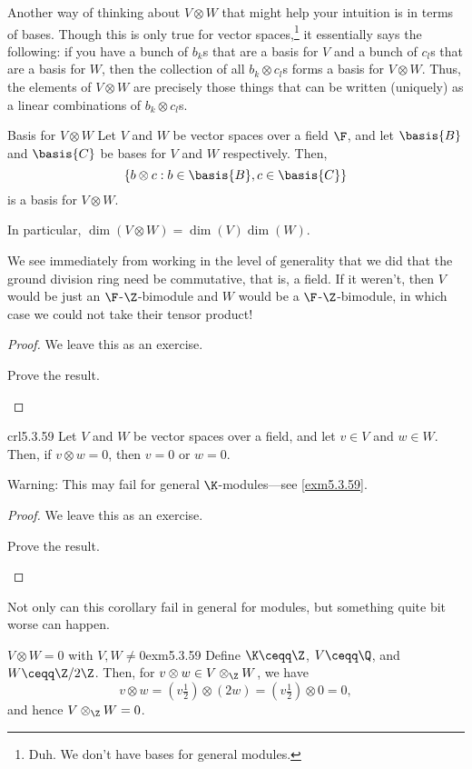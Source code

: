 Another way of thinking about $V\otimes W$ that might help your intuition is in terms of bases.  Though this is only true for vector spaces,\footnote{Duh.  We don't have bases for general modules.} it essentially says the following:  if you have a bunch of $b_k$s that are a basis for $V$ and a bunch of $c_l$s that are a basis for $W$, then the collection of all $b_k\otimes c_l$s forms a basis for $V\otimes W$.  Thus, the elements of $V\otimes W$ are precisely those things that can be written (uniquely) as a linear combinations of $b_k\otimes c_l$s.
\begin{prp}{Basis for $V\otimes W$}{}
	Let $V$ and $W$ be vector spaces over a field $\F$, and let $\basis{B}$ and $\basis{C}$ be bases for $V$ and $W$ respectively.  Then,
	\begin{equation}
	\left\{ b\otimes c:b\in \basis{B},c\in \basis{C}\right\}
	\end{equation}
	is a basis for $V\otimes W$.
	\begin{rmk}
		In particular, $\dim (V\otimes W)=\dim (V)\dim (W)$.
	\end{rmk}
	\begin{rmk}
		We see immediately from working in the level of generality that we did that the ground division ring need be commutative, that is, a field.  If it weren't, then $V$ would be just an $\F$-$\Z$-bimodule and $W$ would be a $\F$-$\Z$-bimodule, in which case we could not take their tensor product!
	\end{rmk}
	\begin{proof}
		We leave this as an exercise.
		\begin{exr}[breakable=false]{}{}
			Prove the result.
		\end{exr}
	\end{proof}
\end{prp}
\begin{crl}{}{crl5.3.59}
	Let $V$ and $W$ be vector spaces over a field, and let $v\in V$ and $w\in W$.  Then, if $v\otimes w=0$, then $v=0$ or $w=0$.
	\begin{rmk}
		Warning:  This may fail for general $\K$-modules---see \cref{exm5.3.59}.
	\end{rmk}
	\begin{proof}
		We leave this as an exercise.
		\begin{exr}[breakable=false]{}{}
			Prove the result.
		\end{exr}
	\end{proof}
\end{crl}
Not only can this corollary fail in general for modules, but something quite bit worse can happen.
\begin{exm}{$V\otimes W=0$ with $V,W\neq 0$}{exm5.3.59}
	Define $\K \ceqq \Z$, $V\ceqq \Q$, and $W\ceqq \Z /2\Z$.  Then, for $v\otimes w\in V\otimes _{\Z}W$, we have
	\begin{equation}
	v\otimes w=\left( v\tfrac{1}{2}\right) \otimes (2w)=\left( v\tfrac{1}{2}\right) \otimes 0=0,
	\end{equation}
	and hence $V\otimes _{\Z}W=0$.
\end{exm}

